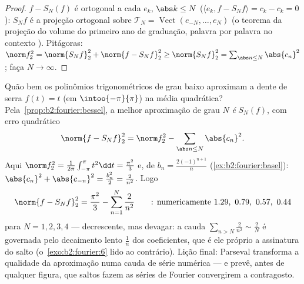 \begin{proof}
$f - S_N(f)$ é ortogonal a cada $e_k$, $\abs k \leq N$ ($\langle
e_k, f - S_N f\rangle = c_k - c_k = 0$): $S_Nf$ é a projeção
ortogonal sobre $\mathcal{T}_N = \operatorname{Vect}(e_{-N}, \dots,
e_N)$ (o teorema da projeção do volume do primeiro ano de graduação, palavra por palavra no
contexto ). Pitágoras: $\norm f_2^2 = \norm{S_Nf}_2^2 +
\norm{f - S_Nf}_2^2 \geq \norm{S_Nf}_2^2 = \sum_{\abs n \leq N}
\abs{c_n}^2$; faça $N \to \infty$.
\end{proof}

\begin{example}\label{ex:b2:fourier:bestapprox}
Quão bem os polinômios trigonométricos de grau baixo aproximam
a dente de serra $f(t) = t$ (em $\intoo{-\pi}{\pi}$) na
média quadrática? Pela~\cref{prop:b2:fourier:bessel}, a melhor
aproximação de grau $N$ \emph{é} $S_N(f)$, com erro quadrático
\[
\norm{f - S_Nf}_2^2 = \norm f_2^2 -
\sum_{\abs n\leq N}\abs{c_n}^2 .
\]
Aqui $\norm f_2^2 = \frac{1}{2\pi}\int_{-\pi}^\pi t^2\dd t =
\frac{\pi^2}{3}$ e, de $b_n = \frac{2(-1)^{n+1}}{n}$
(\cref{ex:b2:fourier:basel}): $\abs{c_n}^2 + \abs{c_{-n}}^2 =
\frac{b_n^2}{2} = \frac{2}{n^2}$. Logo
\[
\norm{f - S_Nf}_2^2
= \frac{\pi^2}{3} - \sum_{n=1}^{N}\frac{2}{n^2}
\qquad\text{: numericamente } 1.29,\ 0.79,\ 0.57,\ 0.44
\]
para $N = 1, 2, 3, 4$ --- decrescente, mas devagar: a cauda
$\sum_{n>N}\frac2{n^2} \sim \frac2N$ é governada pelo decaimento lento
$\frac1n$ dos coeficientes, que é ele próprio a assinatura
do salto (o~\cref{exo:b2:fourier:6} lido ao contrário). Lição
final: Parseval transforma a qualidade da aproximação numa cauda de
série numérica --- e prevê, antes de qualquer figura, que
saltos fazem as séries de Fourier convergirem a contragosto.
\end{example}

